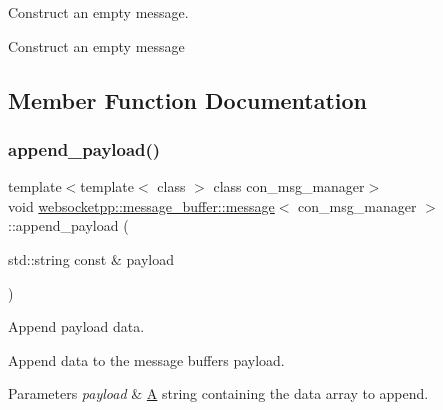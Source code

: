 Construct an empty message. 

Construct an empty message 

\subsection{Member Function Documentation}
\mbox{\label{classwebsocketpp_1_1message__buffer_1_1message_addb7f631d522de382d5dd668a1b66020}} 
\subsubsection{\texorpdfstring{append\+\_\+payload()}{append\_payload()}\hspace{0.1cm}{\footnotesize\ttfamily [1/2]}}
{\footnotesize\ttfamily template$<$template$<$ class $>$ class con\+\_\+msg\+\_\+manager$>$ \\
void \mbox{\hyperlink{classwebsocketpp_1_1message__buffer_1_1message}{websocketpp\+::message\+\_\+buffer\+::message}}$<$ con\+\_\+msg\+\_\+manager $>$\+::append\+\_\+payload (\begin{DoxyParamCaption}\item[{std\+::string const \&}]{payload }\end{DoxyParamCaption})\hspace{0.3cm}{\ttfamily [inline]}}



Append payload data. 

Append data to the message buffer\textquotesingle{}s payload.


\begin{DoxyParams}{Parameters}
{\em payload} & \mbox{\hyperlink{struct_a}{A}} string containing the data array to append. \\
\hline
\end{DoxyParams}
\mbox{\label{classwebsocketpp_1_1message__buffer_1_1message_a85cbf746725a6e34fef2b51604a29c71}} 
